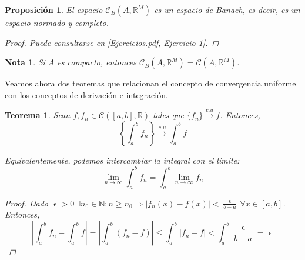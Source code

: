\documentclass[11pt, a4paper]{article}
\let\epsilon\upvarepsilon
\newcommand{\fn}{\{f_n\}}
\theoremstyle{theorem-style}
\newtheorem{nth}{Teorema}[section]
\newtheorem*{nprop}{Proposición}
\theoremstyle{definition-style}
\theoremstyle{remark-style}
\newtheorem*{nota}{Nota}
\theoremstyle{example-style}
\begin{document}
\begin{nprop} El espacio $\mathcal{C}_B(A, \mathbb{R}^M)$ es un espacio de Banach, es decir, es un espacio normado y completo.

\begin{proof}

	Puede consultarse en \textit{[Ejercicios.pdf, Ejercicio 1]}.
\end{proof}

\end{nprop}


\begin{nota}
Si $A$ es compacto, entonces  $\mathcal{C}_B(A,\mathbb{R}^M) = \mathcal{C}(A, \mathbb{R}^M)$.
\end{nota}

Veamos ahora dos teoremas que relacionan el concepto de convergencia uniforme con los conceptos de derivación e integración.

\begin{nth} Sean $f, f_n \in \mathcal{C}([a,b],\mathbb{R})$ tales que $\fn \xrightarrow {c.u} f$. Entonces, $$\left\{\int_a^b f_n\right\} \xrightarrow {c.u} \int_a^b f $$

Equivalentemente, podemos intercambiar la integral con el límite: $$\lim_{n\rightarrow \infty} \int_a^b f_n = \int_a^b \lim_{n\rightarrow \infty} f_n$$

\begin{proof} Dado $\displaystyle \epsilon >0\ \exists n_0 \in \mathbb{N}: n \ge n_0 \Rightarrow |f_n(x)-f(x)| < \frac{\epsilon}{b-a}\ \forall x \in [a,b]$. Entonces, $$\left| \int_a^b f_n - \int _a^b f \right| = \left| \int_a^b (f_n - f) \right| \le \int_a^b |f_n - f| < \int_a^b \frac{\epsilon}{b-a} = \epsilon$$
\end{proof}
\end{nth}
\end{document}
